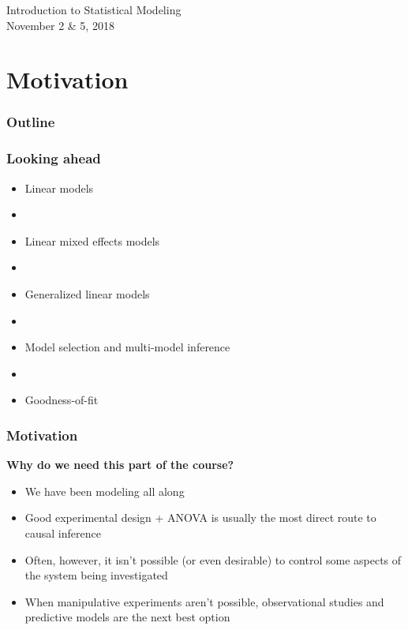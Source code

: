 \documentclass[color=usenames,dvipsnames]{beamer}\usepackage[]{graphicx}\usepackage[]{color}
\begin{document}



\begin{frame}[plain]
  \huge
  \centering \par
  \textcolor{NavyBlue}{Introduction to Statistical Modeling} \\
  \vspace{1cm}
  \Large
  November 2 \& 5, 2018 \par
\end{frame}


\section{Motivation}


\begin{frame}
  \frametitle{Outline}
  \LARGE
\end{frame}



\begin{frame}
  \frametitle{Looking ahead}
  \Large
  \begin{itemize}
    \item Linear models
    \item[]
    \item Linear mixed effects models
    \item[]
    \item Generalized linear models
    \item[]
    \item Model selection and multi-model inference
    \item[]
    \item Goodness-of-fit
  \end{itemize}
\end{frame}




\begin{frame}
  \frametitle{Motivation}
  \large
  {\bf Why do we need this part of the course? \par}
  \pause
  \begin{itemize}[<+->]
    \item We have been modeling all along
    \item Good experimental design + ANOVA is usually the most direct
      route to causal inference
    \item Often, however, it isn't possible (or even desirable) to
      control some aspects of the system being investigated
    \item When manipulative experiments aren't %
      possible, observational studies
      and predictive models are the next best option
  \end{itemize}
\end{frame}
\end{document}
